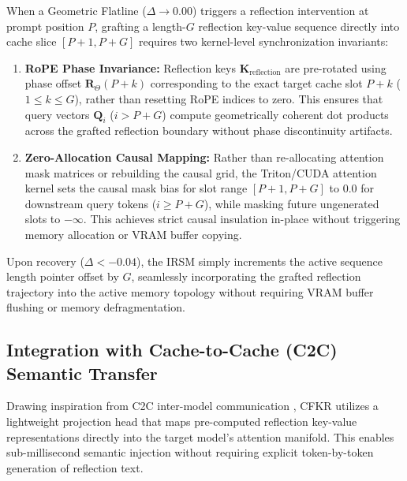 \documentclass[11pt,twocolumn]{article}
\begin{document}
\begin{enumerate}
When a Geometric Flatline ($\Delta \to 0.00$) triggers a reflection intervention at prompt position $P$, grafting a length-$G$ reflection key-value sequence directly into cache slice $[P+1, P+G]$ requires two kernel-level synchronization invariants:
\begin{enumerate}
    \item \textbf{RoPE Phase Invariance:} Reflection keys $\mathbf{K}_{\text{reflection}}$ are pre-rotated using phase offset $\mathbf{R}_{\Theta}(P+k)$ corresponding to the exact target cache slot $P+k$ ($1 \le k \le G$), rather than resetting RoPE indices to zero. This ensures that query vectors $\mathbf{Q}_i$ ($i > P+G$) compute geometrically coherent dot products across the grafted reflection boundary without phase discontinuity artifacts.
    \item \textbf{Zero-Allocation Causal Mapping:} Rather than re-allocating attention mask matrices or rebuilding the causal grid, the Triton/CUDA attention kernel sets the causal mask bias for slot range $[P+1, P+G]$ to $0.0$ for downstream query tokens ($i \ge P+G$), while masking future ungenerated slots to $-\infty$. This achieves strict causal insulation in-place without triggering memory allocation or VRAM buffer copying.
\end{enumerate}
Upon recovery ($\Delta < -0.04$), the IRSM simply increments the active sequence length pointer offset by $G$, seamlessly incorporating the grafted reflection trajectory into the active memory topology without requiring VRAM buffer flushing or memory defragmentation.

\subsection{Integration with Cache-to-Cache (C2C) Semantic Transfer}
Drawing inspiration from C2C inter-model communication \cite{fu2025cache}, CFKR utilizes a lightweight projection head that maps pre-computed reflection key-value representations directly into the target model's attention manifold. This enables sub-millisecond semantic injection without requiring explicit token-by-token generation of reflection text.


\end{enumerate}
\end{document}

